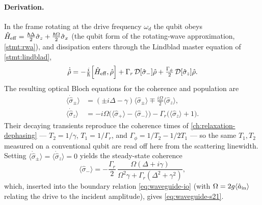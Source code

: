\paragraph{Derivation.}
In the frame rotating at the drive frequency $\omega_d$ the qubit
obeys $\hat{H}_{\rm eff}=\tfrac{\hbar\Delta}{2}\hat\sigma_z
+\tfrac{\hbar\Omega}{2}\hat\sigma_x$ (the qubit form of the
rotating-wave approximation, \cref{stmt:rwa}), and dissipation enters
through the Lindblad master equation of \cref{stmt:lindblad},
\begin{equation}
\label{eq:waveguide-master}
\dot{\op\rho}=-\tfrac{i}{\hbar}\comm{\op H_{\rm eff}}{\op\rho}
 + \Gamma_r\,\mathcal D[\hat\sigma_-]\op\rho
 + \tfrac{\Gamma_\phi}{2}\,\mathcal D[\hat\sigma_z]\op\rho.
\end{equation}
The resulting optical Bloch equations for the coherence and population
are
\begin{align}
\label{eq:waveguide-bloch}
\langle\dot{\hat\sigma}_\pm\rangle &= (\pm i\Delta-\gamma)\langle\hat\sigma_\pm\rangle
   \mp \tfrac{i\Omega}{2}\langle\hat\sigma_z\rangle,\\
\langle\dot{\hat\sigma}_z\rangle &= -i\Omega\bigl(\langle\hat\sigma_+\rangle-\langle\hat\sigma_-\rangle\bigr)
   -\Gamma_r\bigl(\langle\hat\sigma_z\rangle+1\bigr).
\end{align}
Their decaying transients reproduce the coherence times of
\cref{ch:relaxation-dephasing} --- $T_2=1/\gamma$, $T_1=1/\Gamma_r$,
and $\Gamma_\phi=1/T_2-1/2T_1$ --- so the same $T_1,T_2$ measured on a
conventional qubit are read off here from the scattering linewidth.
Setting $\langle\dot{\hat\sigma}_\pm\rangle=\langle\dot{\hat\sigma}_z\rangle=0$
yields the steady-state coherence
\begin{equation}
\label{eq:waveguide-sigma-minus}
\langle\hat\sigma_-\rangle=-\frac{\Gamma_r}{2}\,
  \frac{\Omega(\Delta+i\gamma)}{\Omega^2\gamma+\Gamma_r(\Delta^2+\gamma^2)},
\end{equation}
which, inserted into the boundary relation \cref{eq:waveguide-io} (with
$\Omega=2g\langle\hat a_{\rm in}\rangle$ relating the drive to the
incident amplitude), gives \cref{eq:waveguide-s21}.

